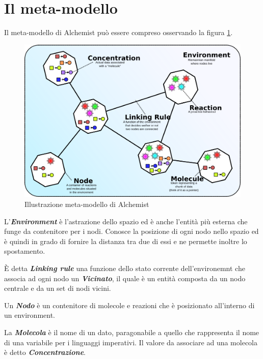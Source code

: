 \documentclass[12pt,a4paper,openright,twoside]{report}
\begin{document}
\section{Il meta-modello}
Il meta-modello di Alchemist pu\`o essere compreso osservando la figura \ref{fig:alchemistModel}.
\begin{figure}[h] %
\begin{center} %
\includegraphics[width=12.5cm]{images/model.png} %
\caption[Illustrazione meta-modello di Alchemist]{Illustrazione meta-modello di Alchemist} \label{fig:alchemistModel}
\end{center}
\end{figure}

L'\textbf{\textit{Environment}} \`e l'astrazione dello spazio ed \`e anche l'entit\`a pi\`u esterna che funge da contenitore per i nodi. Conosce la posizione di ogni nodo nello spazio ed \`e quindi in grado di fornire la distanza tra due di essi e ne permette inoltre lo spostamento.

\`E detta \textbf{\textit{Linking rule}} una funzione dello stato corrente dell'environemnt che associa ad ogni nodo un \textbf{\textit{Vicinato}}, il quale \`e un entit\`a composta da un nodo centrale e da un set di nodi vicini.

Un \textbf{\textit{Nodo}} \`e un contenitore di molecole e reazioni che \`e posizionato all'interno di un environment.

La \textbf{\textit{Molecola}} \`e il nome di un dato, paragonabile a quello che rappresenta il nome di una variabile per i linguaggi imperativi.
Il valore da associare ad una molecola \`e detto \textbf{\textit{Concentrazione}}.
\end{document}
